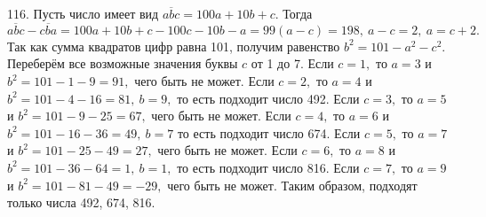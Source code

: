 116. Пусть число имеет вид $\overline{abc}=100a+10b+c.$ Тогда $\overline{abc}-\overline{cba}=100a+10b+c-100c-10b-a=99(a-c)=198,\ a-c=2,\ a=c+2.$ Так как сумма квадратов цифр равна 101, получим равенство $b^2=101-a^2-c^2.$ Переберём все возможные значения буквы $c$ от 1 до 7. Если $c=1,$ то $a=3$ и $b^2=101-1-9=91,$ чего быть не может. Если $c=2,$ то $a=4$ и $b^2=101-4-16=81,\ b=9,$ то есть подходит число 492. Если $c=3,$ то $a=5$ и $b^2=101-9-25=67,$ чего быть не может. Если $c=4,$ то $a=6$ и $b^2=101-16-36=49,\ b=7$ то есть подходит число 674. Если $c=5,$ то $a=7$ и $b^2=101-25-49=27,$ чего быть не может. Если $c=6,$ то $a=8$ и $b^2=101-36-64=1,\ b=1,$ то есть подходит число 816. Если $c=7,$ то $a=9$ и $b^2=101-81-49=-29,$ чего быть не может. Таким образом, подходят только числа 492, 674, 816.\\
